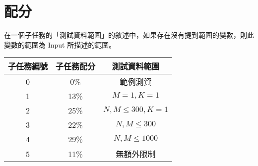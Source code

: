 \documentclass[11pt,a4paper]{article}
\begin{document}
\section*{配分}

在一個子任務的「測試資料範圍」的敘述中，如果存在沒有提到範圍的變數，則此變數的範圍為 Input 所描述的範圍。

\begin{center}
 \begin{tabular}{||c c c||} 
 \hline
 子任務編號 & 子任務配分 & 測試資料範圍 \\  
 \hline
 \hline
 0 & 0\% & 範例測資 \\ 
 \hline
 1 & 13\% & $M =  1 , K = 1 $ \\
 \hline 
 2 & 25\% & $N, M \le  300, K = 1$ \\
 \hline
 3 & 22\% & $N, M \le  300$ \\
 \hline
 4 & 29\% & $N, M \le 1000$ \\
 \hline
 5 & 11\% & 無額外限制 \\
 \hline

\end{tabular}
\end{center}
\end{document}
